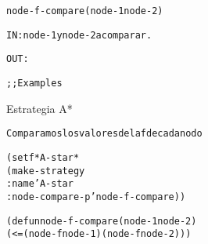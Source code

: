\begin{aibox}{\function}
\begin{alltt}
node-f-compare (node-1 node-2)


IN: 	node-1 y node-2 a comparar.
	
OUT: 

\end{alltt}
\end{aibox}

\begin{aibox}{\examples}
\begin{alltt}
;; Examples


\end{alltt}
\end{aibox}

\begin{aibox}{\comments}
Estrategia A*

\end{aibox}

\begin{aibox}{\pseudocode}
\begin{alltt}

	Comparamos los valores de la f de cada nodo

\end{alltt}
\end{aibox}

\begin{aibox}{\code}
\begin{alltt}
(setf *A-star*
    (make-strategy 
    	:name 'A-star
    	:node-compare-p 'node-f-compare))

(defun node-f-compare (node-1 node-2)
	(<= (node-f node-1) (node-f node-2)))




\end{alltt}
\end{aibox}
